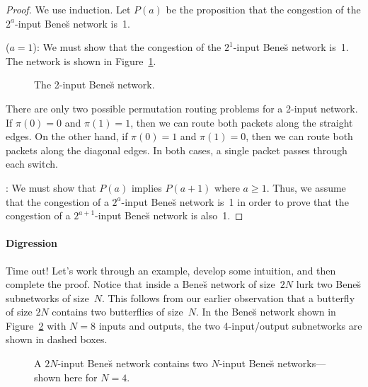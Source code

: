 \begin{proof}
We use induction.  Let $P(a)$ be the proposition that the congestion of
the $2^a$-input Bene\u{s} network is~1.

 ($a = 1$): We must show that the congestion
of the $2^1$-input Bene\u{s} network is~1.  The network is shown in
Figure~\ref{fig:6ET}.

\begin{figure}



\caption{The 2-input Bene\u{s} network.}

\label{fig:6ET}

\end{figure}

There are only two possible permutation routing problems for a 2-input
network.  If $\pi(0) = 0$ and $\pi(1) = 1$, then we can route both
packets along the straight edges.  On the other hand, if $\pi(0) = 1$
and $\pi(1) = 0$, then we can route both packets along the diagonal
edges.  In both cases, a single packet passes through each switch.

: We must show that $P(a)$ implies $P(a
+ 1)$ where $a \ge 1$.  Thus, we assume that the congestion of a
$2^a$-input Bene\u{s} network is~1 in order to prove that the
congestion of a $2^{a + 1}$-input Bene\u{s} network is also~1.

\noqed

\end{proof}

\paragraph{Digression}

Time out!  Let's work through an example, develop some intuition, and
then complete the proof.  Notice that inside a Bene\u{s} network of
size~$2N$ lurk two Bene\u{s} subnetworks of size~$N$.  This follows
from our earlier observation that a butterfly of size $2N$ contains
two butterflies of size~$N$.  In the Bene\u{s} network shown in
Figure~\ref{fig:6EU} with $N=8$ inputs and outputs, the two
4-input/output subnetworks are shown in dashed boxes.

\begin{figure}



\caption{A $2N$-input Bene\u{s} network contains two $N$-input
  Bene\u{s} networks---shown here for $N = 4$.}

\label{fig:6EU}

\end{figure}

